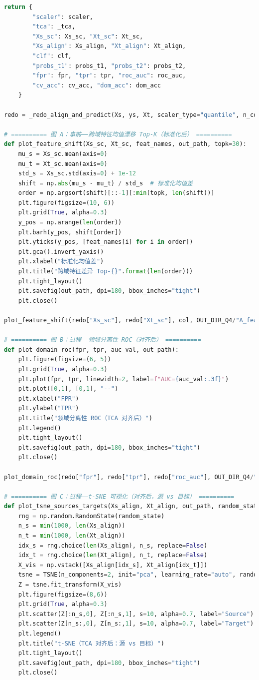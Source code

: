 \documentclass[a4paper]{CPIPC}
\numberwithin{equation}{section}
\begin{document}
\begin{lstlisting}[language=Python, caption=Random Forest Classifier]
    return {
        "scaler": scaler,
        "tca": _tca,
        "Xs_sc": Xs_sc, "Xt_sc": Xt_sc,
        "Xs_align": Xs_align, "Xt_align": Xt_align,
        "clf": clf,
        "probs_t1": probs_t1, "probs_t2": probs_t2,
        "fpr": fpr, "tpr": tpr, "roc_auc": roc_auc,
        "cv_acc": cv_acc, "dom_acc": dom_acc
    }

redo = _redo_align_and_predict(Xs, ys, Xt, scaler_type="quantile", n_comp=15, tau=0.75, random_state=42)

# ========== 图 A：事前——跨域特征均值漂移 Top-K（标准化后） ==========
def plot_feature_shift(Xs_sc, Xt_sc, feat_names, out_path, topk=30):
    mu_s = Xs_sc.mean(axis=0)
    mu_t = Xt_sc.mean(axis=0)
    std_s = Xs_sc.std(axis=0) + 1e-12
    shift = np.abs(mu_s - mu_t) / std_s  # 标准化均值差
    order = np.argsort(shift)[::-1][:min(topk, len(shift))]
    plt.figure(figsize=(10, 6))
    plt.grid(True, alpha=0.3)
    y_pos = np.arange(len(order))
    plt.barh(y_pos, shift[order])
    plt.yticks(y_pos, [feat_names[i] for i in order])
    plt.gca().invert_yaxis()
    plt.xlabel("标准化均值差")
    plt.title("跨域特征差异 Top-{}".format(len(order)))
    plt.tight_layout()
    plt.savefig(out_path, dpi=180, bbox_inches="tight")
    plt.close()

plot_feature_shift(redo["Xs_sc"], redo["Xt_sc"], col, OUT_DIR_Q4/"A_feature_shift_topk.png", topk=20)

# ========== 图 B：过程——领域分离性 ROC（对齐后） ==========
def plot_domain_roc(fpr, tpr, auc_val, out_path):
    plt.figure(figsize=(6, 5))
    plt.grid(True, alpha=0.3)
    plt.plot(fpr, tpr, linewidth=2, label=f"AUC={auc_val:.3f}")
    plt.plot([0,1], [0,1], "--")
    plt.xlabel("FPR")
    plt.ylabel("TPR")
    plt.title("领域分离性 ROC（TCA 对齐后）")
    plt.legend()
    plt.tight_layout()
    plt.savefig(out_path, dpi=180, bbox_inches="tight")
    plt.close()

plot_domain_roc(redo["fpr"], redo["tpr"], redo["roc_auc"], OUT_DIR_Q4/"B_domain_roc.png")

# ========== 图 C：过程——t-SNE 可视化（对齐后，源 vs 目标） ==========
def plot_tsne_sources_targets(Xs_align, Xt_align, out_path, random_state=42):
    rng = np.random.RandomState(random_state)
    n_s = min(1000, len(Xs_align))
    n_t = min(1000, len(Xt_align))
    idx_s = rng.choice(len(Xs_align), n_s, replace=False)
    idx_t = rng.choice(len(Xt_align), n_t, replace=False)
    X_vis = np.vstack([Xs_align[idx_s], Xt_align[idx_t]])
    tsne = TSNE(n_components=2, init="pca", learning_rate="auto", random_state=random_state, perplexity=30)
    Z = tsne.fit_transform(X_vis)
    plt.figure(figsize=(8,6))
    plt.grid(True, alpha=0.3)
    plt.scatter(Z[:n_s,0], Z[:n_s,1], s=10, alpha=0.7, label="Source")
    plt.scatter(Z[n_s:,0], Z[n_s:,1], s=10, alpha=0.7, label="Target")
    plt.legend()
    plt.title("t-SNE（TCA 对齐后：源 vs 目标）")
    plt.tight_layout()
    plt.savefig(out_path, dpi=180, bbox_inches="tight")
    plt.close()


\end{lstlisting}
\end{document}
